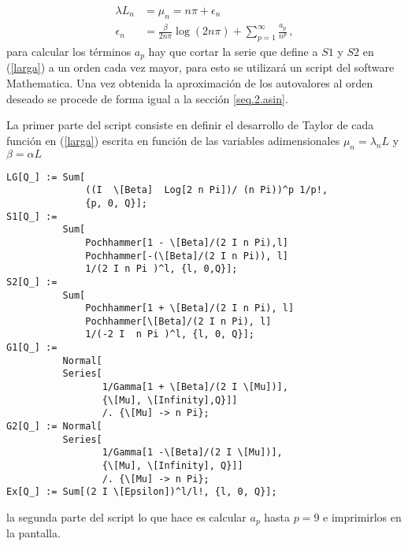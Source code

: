 \begin{equation}
\begin{aligned}
\lambda L _n &= \mu _n  = 
			n \pi + \epsilon _n \\
			\epsilon _n &= 
			\frac{ \beta }{2 n \pi } \log (2 n \pi) +
			\sum _{p=1} ^{\infty} \frac{a _p}{n ^p }
			\, ,
\end{aligned}
\end{equation}
para calcular los términos $a_p $ hay que cortar la serie que define a  $S1 $ y $S2$ en (\ref{larga}) a un orden cada vez mayor, para esto se utilizará un script del software Mathematica. Una vez obtenida la aproximación de los autovalores al orden deseado se procede de forma igual a la sección \ref{seq.2.asin}.


La primer parte del script consiste en definir el desarrollo de Taylor de cada función  en (\ref{larga}) escrita en función de las variables adimensionales $\mu _n = \lambda _n L$ y $\beta = \alpha L$

\begin{verbatim}
LG[Q_] := Sum[
              ((I  \[Beta]  Log[2 n Pi])/ (n Pi))^p 1/p!, 
              {p, 0, Q}];
S1[Q_] := 
          Sum[
              Pochhammer[1 - \[Beta]/(2 I n Pi),l] 
              Pochhammer[-(\[Beta]/(2 I n Pi)), l] 
              1/(2 I n Pi )^l, {l, 0,Q}];
S2[Q_] := 
          Sum[
              Pochhammer[1 + \[Beta]/(2 I n Pi), l] 
              Pochhammer[\[Beta]/(2 I n Pi), l] 
              1/(-2 I  n Pi )^l, {l, 0, Q}];
G1[Q_] := 
          Normal[
          Series[
                 1/Gamma[1 + \[Beta]/(2 I \[Mu])], 
                 {\[Mu], \[Infinity],Q}]] 
                 /. {\[Mu] -> n Pi};
G2[Q_] := Normal[
          Series[
                 1/Gamma[1 -\[Beta]/(2 I \[Mu])], 
                 {\[Mu], \[Infinity], Q}]] 
                 /. {\[Mu] -> n Pi};
Ex[Q_] := Sum[(2 I \[Epsilon])^l/l!, {l, 0, Q}];
\end{verbatim}
la segunda parte del script lo que hace es calcular $a_p$ hasta $p=9$ e imprimirlos en la pantalla.

